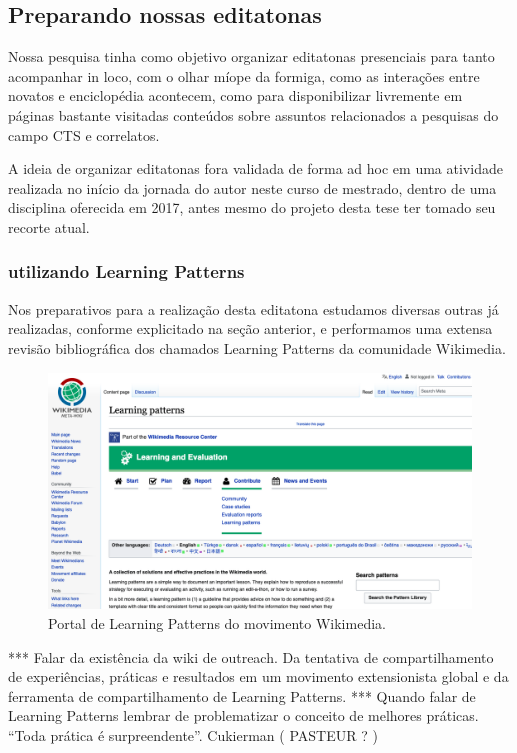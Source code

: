 \subsection{Preparando nossas editatonas}

Nossa pesquisa tinha como objetivo organizar editatonas presenciais para tanto acompanhar in loco, com o olhar míope da formiga, como as interações entre novatos e enciclopédia acontecem, como para disponibilizar livremente em páginas bastante visitadas conteúdos sobre assuntos relacionados a pesquisas do campo CTS e correlatos.

A ideia de organizar editatonas fora validada de forma ad hoc em uma atividade realizada no início da jornada do autor neste curso de mestrado, dentro de uma disciplina oferecida em 2017, antes mesmo do projeto desta tese ter tomado seu recorte atual.

\subsubsection{utilizando Learning Patterns}

Nos preparativos para a realização desta editatona estudamos diversas outras já realizadas, conforme explicitado na seção anterior, e performamos uma extensa revisão bibliográfica dos chamados Learning Patterns da comunidade Wikimedia.

\begin{figure}[H]
    \centering
    \includegraphics[width=1\textwidth]{Images/learning_patterns.png}
    \caption{Portal de Learning Patterns do movimento Wikimedia.}
    \label{fig:learning_patterns}
\end{figure}

*** Falar da existência da wiki de outreach. Da tentativa de compartilhamento de experiências, práticas e resultados em um movimento extensionista global e da ferramenta de compartilhamento de Learning Patterns.
*** Quando falar de Learning Patterns lembrar de problematizar o conceito de melhores práticas. “Toda prática é surpreendente”. Cukierman ( PASTEUR ? )

